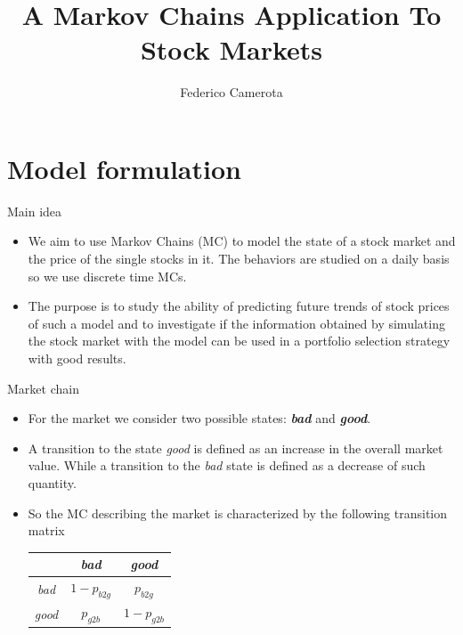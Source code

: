 \documentclass{beamer}
\title{A Markov Chains Application To Stock Markets}
\author{Federico Camerota}
\date{}
\begin{document}
	\maketitle
	\section{Model formulation}
	
	\begin{frame}{Main idea}
	\begin{itemize}
		\item We aim to use Markov Chains (MC) to model the state of a stock market and
		the price of the single stocks in it. The behaviors are studied on a daily basis so we use
		discrete time MCs.\\
		\vspace{10pt}
		\item The purpose is to study the ability of predicting future trends of stock prices of such a model and to 
		investigate if the information obtained by simulating the stock market with the model can be used in a 
		portfolio selection strategy with good results.
	\end{itemize}
	\end{frame}
	
	
	\begin{frame}{Market chain}
	\begin{itemize}
		\item For the market we consider two possible states: \textbf{\textit{bad}} and \textbf{\textit{good}}.
		\item A transition to the state \textit{good} is defined as an increase in the overall
			  market value. While a transition to the \textit{bad} state is defined as a decrease
			  of such quantity.
		\item So the MC describing the market is characterized by the following transition matrix\\
				\vspace{2pt}
				\begin{center}
				\begin{tabular}{c|c|c|}
					\phantom{good} & \textit{bad}  & \textit{good}\\
					\hline
					\textit{bad}   & $1 - p_{b2g}$ & $p_{b2g}$\\
					\hline
					\textit{good}  & $p_{g2b}$     & $1 - p_{g2b}$\\
					\hline
				\end{tabular}
				\end{center}	
	\end{itemize}
	\end{frame}
\end{document}
